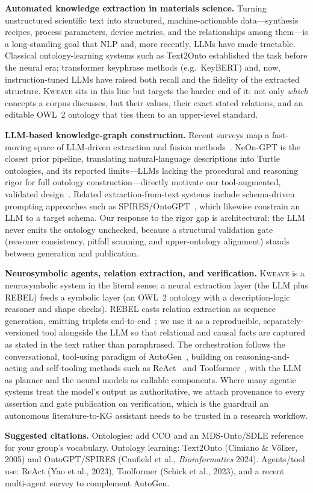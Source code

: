 \documentclass[Afour,sageh,times]{sagej}
\newcommand{\readingnote}[1]{%
  \par\smallskip\noindent\colorbox{gray!12}{%
  \parbox{\dimexpr\linewidth-2\fboxsep}{\footnotesize\textbf{Suggested citations.} #1}}\par}
\begin{document}
\textbf{Automated knowledge extraction in materials science.} Turning unstructured scientific text
into structured, machine-actionable data---synthesis recipes, process parameters, device metrics, and
the relationships among them---is a long-standing goal that NLP and, more recently, LLMs have made
tractable. Classical ontology-learning systems such as Text2Onto established the task before the neural
era; transformer keyphrase methods (e.g.\ KeyBERT) and, now, instruction-tuned LLMs have raised both
recall and the fidelity of the extracted structure. \textsc{Kweave} sits in this line but targets the
harder end of it: not only \emph{which} concepts a corpus discusses, but their values, their exact
stated relations, and an editable OWL~2 ontology that ties them to an upper-level standard.

\textbf{LLM-based knowledge-graph construction.} Recent surveys map a fast-moving space of
LLM-driven extraction and fusion methods~\cite{kgsurvey,llmonto,pan2024unifying}. NeOn-GPT is the
closest prior pipeline, translating natural-language descriptions into Turtle ontologies, and its
reported limits---LLMs lacking the procedural and reasoning rigor for full ontology
construction---directly motivate our tool-augmented, validated design~\cite{neongpt}. Related
extraction-from-text systems include schema-driven prompting approaches such as
SPIRES/OntoGPT~\cite{caufield2024ontogpt}, which likewise constrain an LLM to a target schema. Our
response to the rigor gap is architectural: the LLM never emits the ontology unchecked, because a
structural validation gate (reasoner consistency, pitfall scanning, and upper-ontology alignment)
stands between generation and publication.

\textbf{Neurosymbolic agents, relation extraction, and verification.} \textsc{Kweave} is a
neurosymbolic system in the literal sense: a neural extraction layer (the LLM plus REBEL) feeds a
symbolic layer (an OWL~2 ontology with a description-logic reasoner and shape checks). REBEL casts
relation extraction as sequence generation, emitting triplets end-to-end~\cite{rebel}; we use it as a
reproducible, separately-versioned tool alongside the LLM so that relational and causal facts are
captured as stated in the text rather than paraphrased. The orchestration follows the conversational,
tool-using paradigm of AutoGen~\cite{autogen}, building on reasoning-and-acting and self-tooling
methods such as ReAct~\cite{yao2023react} and Toolformer~\cite{schick2023toolformer}, with the LLM as
planner and the neural models as callable components. Where many agentic systems treat the model's
output as authoritative, we attach provenance to every assertion and gate publication on verification,
which is the guardrail an autonomous literature-to-KG assistant needs to be trusted in a research
workflow.
\readingnote{Ontologies: add CCO and an MDS-Onto/SDLE reference for your group's vocabulary.
Ontology learning: Text2Onto (Cimiano \& V\"olker, 2005) and OntoGPT/SPIRES (Caufield et al.,
\emph{Bioinformatics} 2024). Agents/tool use: ReAct (Yao et al., 2023), Toolformer (Schick et al.,
2023), and a recent multi-agent survey to complement AutoGen.}
\end{document}
